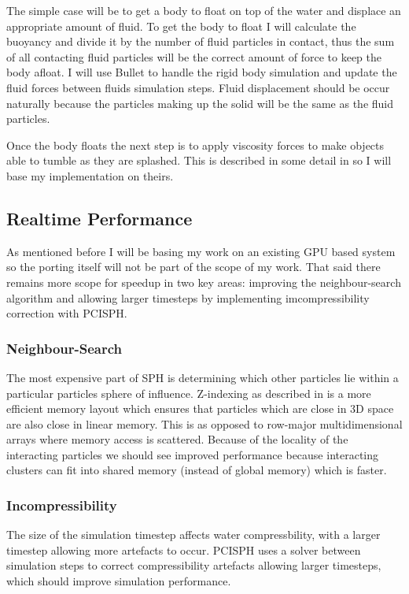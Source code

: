 \documentclass[10pt,a4paper,draft]{article}
\begin{document}
The simple case will be to get a body to float on top of the water and displace an appropriate amount of fluid. To get the body to float I will calculate the buoyancy and divide it by the number of fluid particles in contact, thus the sum of all contacting fluid particles will be the correct amount of force to keep the body afloat. I will use Bullet to handle the rigid body simulation and update the fluid forces between fluids simulation steps. Fluid displacement should be occur naturally because the particles making up the solid will be the same as the fluid particles. \newline

Once the body floats the next step is to apply viscosity forces to make objects able to tumble as they are splashed. This is described in some detail in \cite{Akinci2012} so I will base my implementation on theirs.


\subsection{Realtime Performance}
As mentioned before I will be basing my work on an existing GPU based system so the porting itself will not be part of the scope of my work. That said there remains more scope for speedup in two key areas: improving the  neighbour-search algorithm and allowing larger timesteps by implementing imcompressibility correction with PCISPH.

\subsubsection{Neighbour-Search}
The most expensive part of SPH is determining which other particles lie within a particular particles sphere of influence. Z-indexing as described in \cite{Goswami2010} is a more efficient memory layout which ensures that particles which are close in 3D space are also close in linear memory. This is as opposed to row-major multidimensional arrays where memory access is scattered. Because of the locality of the interacting particles we should see improved performance because interacting clusters can fit into shared memory (instead of global memory) which is faster.       
 
 \subsubsection{Incompressibility}
The size of the simulation timestep affects water compressbility, with a larger timestep allowing more artefacts to occur. PCISPH \cite{Solenthaler2009} uses a solver between simulation steps to correct compressibility artefacts allowing larger timesteps, which should improve simulation performance. 
\end{document}

